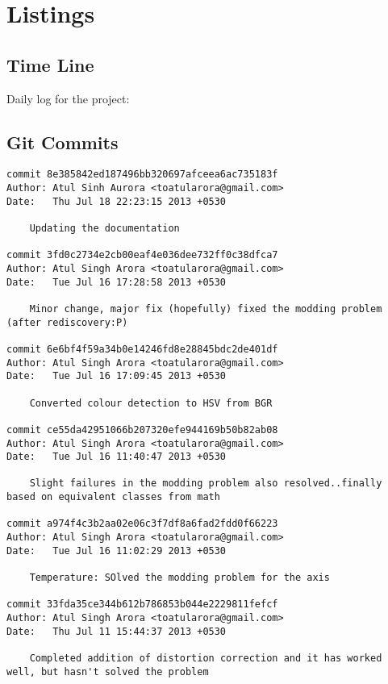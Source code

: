 \chapter{Listings}

\section{Time Line}\label{timeLine}
	Daily log for the project:
	

\section{Git Commits}
			\begin{lstlisting}
commit 8e385842ed187496bb320697afceea6ac735183f
Author: Atul Sinh Aurora <toatularora@gmail.com>
Date:   Thu Jul 18 22:23:15 2013 +0530

    Updating the documentation

commit 3fd0c2734e2cb00eaf4e036dee732ff0c38dfca7
Author: Atul Singh Arora <toatularora@gmail.com>
Date:   Tue Jul 16 17:28:58 2013 +0530

    Minor change, major fix (hopefully) fixed the modding problem (after rediscovery:P)

commit 6e6bf4f59a34b0e14246fd8e28845bdc2de401df
Author: Atul Singh Arora <toatularora@gmail.com>
Date:   Tue Jul 16 17:09:45 2013 +0530

    Converted colour detection to HSV from BGR

commit ce55da42951066b207320efe944169b50b82ab08
Author: Atul Singh Arora <toatularora@gmail.com>
Date:   Tue Jul 16 11:40:47 2013 +0530

    Slight failures in the modding problem also resolved..finally based on equivalent classes from math

commit a974f4c3b2aa02e06c3f7df8a6fad2fdd0f66223
Author: Atul Singh Arora <toatularora@gmail.com>
Date:   Tue Jul 16 11:02:29 2013 +0530

    Temperature: SOlved the modding problem for the axis

commit 33fda35ce344b612b786853b044e2229811fefcf
Author: Atul Singh Arora <toatularora@gmail.com>
Date:   Thu Jul 11 15:44:37 2013 +0530

    Completed addition of distortion correction and it has worked well, but hasn't solved the problem


\end{lstlisting}
